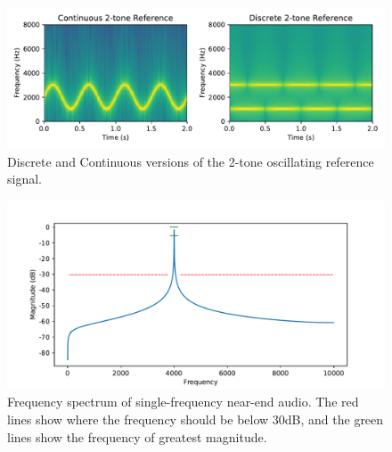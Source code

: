 \documentclass[a4paper,10pt]{article}
\begin{document}
\begin{figure}[h]
\includegraphics[width=\textwidth]{reference}
\caption{Discrete and Continuous versions of the 2-tone oscillating reference
signal.}
\label{fig-ref}
\end{figure}

\begin{figure}[h]
\includegraphics[width=\textwidth]{single-freq}
\caption{Frequency spectrum of single-frequency near-end audio. The red lines
show where the frequency should be below 30dB, and the green lines show the
frequency of greatest magnitude.}
\label{fig-similar}
\end{figure}
\end{document}
